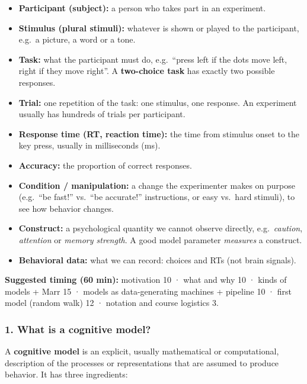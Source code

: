 \begin{itemize}
\tightlist
\item
  \textbf{Participant (subject):} a person who takes part in an
  experiment.
\item
  \textbf{Stimulus (plural stimuli):} whatever is shown or played to the
  participant, e.g.~a picture, a word or a tone.
\item
  \textbf{Task:} what the participant must do, e.g.~``press left if the
  dots move left, right if they move right''. A \textbf{two-choice task}
  has exactly two possible responses.
\item
  \textbf{Trial:} one repetition of the task: one stimulus, one
  response. An experiment usually has hundreds of trials per
  participant.
\item
  \textbf{Response time (RT, reaction time):} the time from stimulus
  onset to the key press, usually in milliseconds (ms).
\item
  \textbf{Accuracy:} the proportion of correct responses.
\item
  \textbf{Condition / manipulation:} a change the experimenter makes on
  purpose (e.g.~``be fast!'' vs.~``be accurate!'' instructions, or easy
  vs.~hard stimuli), to see how behavior changes.
\item
  \textbf{Construct:} a psychological quantity we cannot observe
  directly, e.g.~\emph{caution}, \emph{attention} or \emph{memory
  strength}. A good model parameter \emph{measures} a construct.
\item
  \textbf{Behavioral data:} what we can record: choices and RTs (not
  brain signals).
\end{itemize}

\textbf{Suggested timing (60 min):} motivation 10 · what and why 10 ·
kinds of models + Marr 15 · models as data-generating machines +
pipeline 10 · first model (random walk) 12 · notation and course
logistics 3.

\subsubsection{1. What is a cognitive model?}

A \textbf{cognitive model} is an explicit, usually mathematical or
computational, description of the processes or representations that are
assumed to produce behavior. It has three ingredients:

